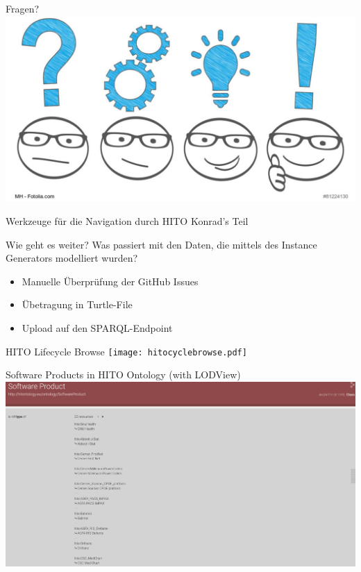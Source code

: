 \documentclass[aspectratio=1610,12pt]{beamer}
\begin{document}
\begin{frame}{Fragen?}
  \centering
  \vspace{-0.5cm}
  \includegraphics[width=\textwidth]{img/fragen.png}
\end{frame}

\begin{frame}{Werkzeuge für die Navigation durch HITO}
  \centering
  \huge Konrad's Teil
\end{frame}
\begin{frame}{Wie geht es weiter?}
  Was passiert mit den Daten, die mittels des Instance Generators modelliert wurden?
  \begin{itemize}
    \item Manuelle Überprüfung der GitHub Issues
    \item Übetragung in Turtle-File
    \item Upload auf den SPARQL-Endpoint
  \end{itemize}
\end{frame}
\begin{frame}{HITO Lifecycle Browse}
  \centering
  \vspace{-0.5cm}
  \texttt{[image: hitocyclebrowse.pdf]}
\end{frame}

\begin{frame}{Software Products in HITO Ontology (with LODView)}
\centering
\includegraphics[width=\textwidth]{img/softwareproduct.png}
\end{frame}
\end{document}
